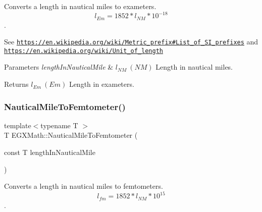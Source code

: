 Converts a length in nautical miles to exameters. \[ l_{Em}=1852 * l_{NM} * 10^{-18} \]. 

See \href{https://en.wikipedia.org/wiki/Metric_prefix#List_of_SI_prefixes}{\tt https\+://en.\+wikipedia.\+org/wiki/\+Metric\+\_\+prefix\#\+List\+\_\+of\+\_\+\+S\+I\+\_\+prefixes} and \href{https://en.wikipedia.org/wiki/Unit_of_length}{\tt https\+://en.\+wikipedia.\+org/wiki/\+Unit\+\_\+of\+\_\+length} 
\begin{DoxyParams}{Parameters}
{\em length\+In\+Nautical\+Mile} & $ l_{NM}\ (NM)$ Length in nautical miles. \\
\hline
\end{DoxyParams}
\begin{DoxyReturn}{Returns}
$ l_{Em}\ (Em)$ Length in exameters. 
\end{DoxyReturn}
\mbox{\label{group___e_g_x_math-_conversions-_length_conversions-_nautical-_nautical_mile-_s_i_gacb38ddd47f497e26e3f0dcc8d32cca85}} 
\subsubsection{\texorpdfstring{Nautical\+Mile\+To\+Femtometer()}{NauticalMileToFemtometer()}}
{\footnotesize\ttfamily template$<$typename T $>$ \\
T E\+G\+X\+Math\+::\+Nautical\+Mile\+To\+Femtometer (\begin{DoxyParamCaption}\item[{const T}]{length\+In\+Nautical\+Mile }\end{DoxyParamCaption})}



Converts a length in nautical miles to femtometers. \[ l_{fm}=1852 * l_{NM} * 10^{15} \]. 

